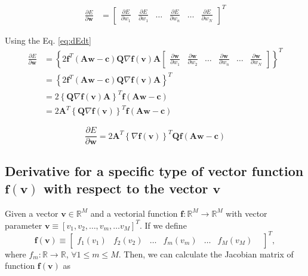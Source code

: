 \begin{align}
\frac{\partial E}{\partial \mathbf{w}}
&=
\begin{bmatrix}
\frac{\partial E}{\partial w_{1}}&
\frac{\partial E}{\partial w_{1}}&
\dots&
\frac{\partial E}{\partial w_{n}}&
\dots&
\frac{\partial E}{\partial w_{N}}
\end{bmatrix}^{T}
\end{align}

Using the Eq. \ref{eq:dEdt}
\begin{align}
\frac{\partial E}{\partial \mathbf{w}}
&=
\left\{
2
\mathbf{f}^{T}\left(\mathbf{A}\mathbf{w}-\mathbf{c}\right)\mathbf{Q}
\nabla \mathbf{f}(\mathbf{v})
\mathbf{A}
\begin{bmatrix}
\frac{\partial \mathbf{w}}{\partial w_{1}}&
\frac{\partial \mathbf{w}}{\partial w_{2}}&
\dots&
\frac{\partial \mathbf{w}}{\partial w_{n}}&
\dots&
\frac{\partial \mathbf{w}}{\partial w_{N}}
\end{bmatrix}
\right\}^{T}\\[4pt]
&=
\left\{
2
\mathbf{f}^{T}\left(\mathbf{A}\mathbf{w}-\mathbf{c}\right)\mathbf{Q}
\nabla \mathbf{f}(\mathbf{v})
\mathbf{A}
\right\}^{T}\\[4pt]
&=
2
\left\{
\mathbf{Q}
\nabla \mathbf{f}(\mathbf{v})
\mathbf{A}
\right\}^{T}
\mathbf{f}\left(\mathbf{A}\mathbf{w}-\mathbf{c}\right)\\[4pt]
&=
2
\mathbf{A}^{T}
\left\{
\mathbf{Q}
\nabla \mathbf{f}(\mathbf{v})
\right\}^{T}
\mathbf{f}\left(\mathbf{A}\mathbf{w}-\mathbf{c}\right)
\end{align}

\begin{equation}
\frac{\partial E}{\partial \mathbf{w}}
=
2
\mathbf{A}^{T}
\left\{
\nabla \mathbf{f}(\mathbf{v})
\right\}^{T}
\mathbf{Q}
\mathbf{f}\left(\mathbf{A}\mathbf{w}-\mathbf{c}\right)
\end{equation}

\subsection{Derivative for a specific type of vector function $\mathbf{f}(\mathbf{v})$ with respect to the vector $\mathbf{v}$}

Given 
a vector $\mathbf{v} \in \mathbb{R}^{M}$ and 
a vectorial function $\mathbf{f}:\mathbb{R}^{M} \to \mathbb{R}^{M}$ with vector parameter 
$\mathbf{v}\equiv \left[v_{1}, v_{2}, \dots,v_{m},\dots v_{M}\right]^{T}$.
If we define 
\begin{equation}
\mathbf{f}(\mathbf{v}) 
\equiv
\begin{bmatrix}
f_{1}(v_{1}) &
f_{2}(v_{2}) &
\dots&
f_{m}(v_{m}) &
\dots&
f_{M}(v_{M}) &
\end{bmatrix}^{T},
\end{equation}
where $f_{m}:\mathbb{R} \to \mathbb{R}$, $\forall 1 \leq m\leq M$.
Then, we can calculate the Jacobian matrix of function $\mathbf{f}(\mathbf{v})$ as

